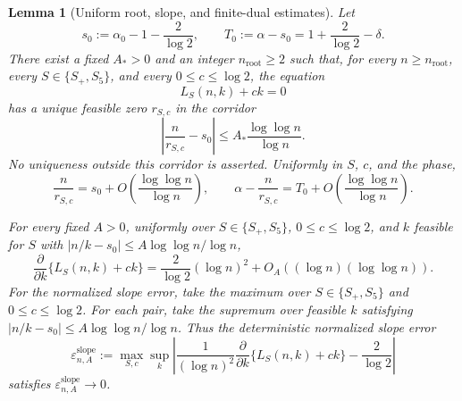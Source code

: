 \documentclass[a4paper,10pt,reqno]{amsart}
\numberwithin{equation}{section}
\theoremstyle{plain}
\newtheorem{lemma}[theorem]{Lemma}
\theoremstyle{remark}
\begin{document}
\begin{lemma}[Uniform root, slope, and finite-dual estimates]
\label{lem:uniform-root-slope-dual}
Let
\begin{equation*}
  s_0:=\alpha_0-1-\frac2{\log 2},
  \qquad
  T_0:=\alpha-s_0
      =1+\frac2{\log 2}-\delta.
  \tag{3.5}
\end{equation*}
There exist a fixed $A_*>0$ and an integer $n_{\mathrm{root}}\ge2$ such that,
for every $n\ge n_{\mathrm{root}}$, every $S\in\{S_+,S_5\}$, and every
$0\le c\le\log 2$, the equation
\[
  L_S(n,k)+ck=0
\]
has a unique feasible zero $r_{S,c}$ in the
  corridor
\[
  \left|\frac n{r_{S,c}}-s_0\right|
  \le A_*\frac{\log\log n}{\log n}.
\]
No uniqueness outside this corridor is asserted.
Uniformly in $S$, $c$, and the phase,
\begin{equation*}
  \frac n{r_{S,c}}
  =s_0+O\!\left(\frac{\log\log n}{\log n}\right),
  \qquad
  \alpha-\frac n{r_{S,c}}
  =T_0+O\!\left(\frac{\log\log n}{\log n}\right).
  \tag{3.6}
\end{equation*}

For every fixed $A>0$, uniformly over $S\in\{S_+,S_5\}$,
$0\le c\le\log 2$, and $k$ feasible for $S$ with
$|n/k-s_0|\le A\log\log n/\log n$,
\begin{equation*}
  \frac{\partial}{\partial k}\{L_S(n,k)+ck\}
  =\frac2{\log 2}(\log n)^2
   +O_A((\log n)(\log\log n)).
  \tag{3.7}
\end{equation*}
For the normalized slope error, take the maximum over
$S\in\{S_+,S_5\}$ and $0\le c\le\log 2$. For each pair, take the supremum
over feasible $k$ satisfying $|n/k-s_0|\le A\log\log n/\log n$. Thus the
deterministic normalized slope error
\[
  \varepsilon_{n,A}^{\mathrm{slope}}
  :=
  \max_{S,c}
  \sup_k
  \left|
    \frac{1}{(\log n)^2}
    \frac{\partial}{\partial k}\{L_S(n,k)+ck\}
    -\frac2{\log 2}
  \right|
\]
satisfies $\varepsilon_{n,A}^{\mathrm{slope}}\to0$.


\end{lemma}
\end{document}

